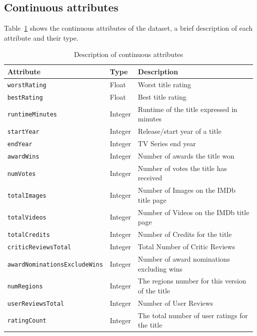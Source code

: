 \subsection{Continuous attributes}
Table~\ref{tab:numerical_attributes} shows the continuous attributes of the dataset,
a brief description of each attribute and their type.
\begin{table}[h]
    \centering
    \begin{tabular}{|l|l|l|} %
        \hline
        \textbf{Attribute} & \textbf{Type} & \textbf{Description} \\ 
        \hline
        \texttt{worstRating} & Float & Worst title rating \\ 
        \hline
        \texttt{bestRating} & Float & Best title rating \\ 
        \hline
        \texttt{runtimeMinutes} & Integer & Runtime of the title expressed in minutes \\ 
        \hline
        \texttt{startYear} & Integer & Release/start year of a title \\ 
        \hline
        \texttt{endYear} & Integer & TV Series end year \\
        \hline
        \texttt{awardWins} & Integer & Number of awards the title won \\ 
        \hline
        \texttt{numVotes} & Integer & Number of votes the title has received \\ 
        \hline
        \texttt{totalImages} & Integer & Number of Images on the IMDb title page \\ 
        \hline
        \texttt{totalVideos} & Integer & Number of Videos on the IMDb title page \\ 
        \hline
        \texttt{totalCredits} & Integer & Number of Credits for the title \\ 
        \hline
        \texttt{criticReviewsTotal} & Integer & Total Number of Critic Reviews \\ 
        \hline
        \texttt{awardNominationsExcludeWins} & Integer & Number of award nominations excluding wins \\ 
        \hline
        \texttt{numRegions} & Integer & The regions number for this version of the title \\ 
        \hline
        \texttt{userReviewsTotal} & Integer & Number of User Reviews \\ 
        \hline
        \texttt{ratingCount} & Integer & The total number of user ratings for the title \\ 
        \hline
    \end{tabular}
    \caption{Description of continuous attributes}
    \label{tab:numerical_attributes}
\end{table}



